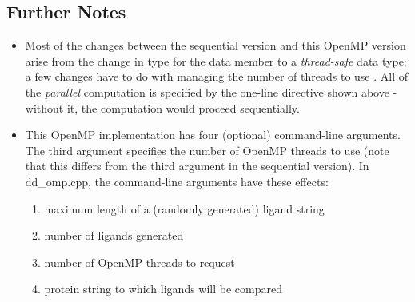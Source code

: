 \documentclass[letterpaper,10pt,openany,oneside]{sphinxmanual}
\begin{document}
\subsection{Further Notes}
\label{openmp/openmp:further-notes}\label{openmp/openmp:tbb}\begin{itemize}
\item {} 
Most of the changes between the sequential version and this OpenMP version arise from the change in type for the data member  to a \emph{thread-safe} data type; a few changes have to do with managing the number of threads to use . All of the \emph{parallel} computation is specified by the one-line  directive shown above - without it, the computation would proceed sequentially.

\item {} 
This OpenMP implementation has four (optional) command-line arguments.  The third argument specifies the number of OpenMP threads to use (note that this differs from the third argument in the sequential version). In dd\_omp.cpp, the command-line arguments have these effects:
\begin{enumerate}
\item {} 
maximum length of a (randomly generated) ligand string

\item {} 
number of ligands generated

\item {} 
number of OpenMP threads to request

\item {} 
protein string to which ligands will be compared

\end{enumerate}

\end{itemize}
\end{document}
